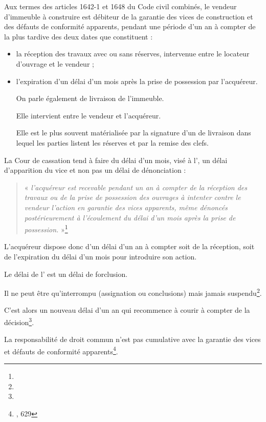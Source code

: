 				Aux termes des articles 1642-1 et 1648 du Code civil combinés, le vendeur d’immeuble à construire est débiteur de la garantie des vices de construction et des défauts de conformité apparents, pendant une période d’un an à compter de la plus tardive des deux dates que constituent :
				\begin{itemize}
					\item la réception des travaux avec ou sans réserves, intervenue entre le locateur d’ouvrage et le vendeur ;

					\item l’expiration d’un délai d’un mois après la prise de possession par l’acquéreur.

						On parle également de livraison de l’immeuble.

						Elle intervient entre le vendeur et l’acquéreur.

						Elle est le plus souvent matérialisée par la signature d’un \pv de livraison dans lequel les parties listent les réserves et par la remise des clefs.
				\end{itemize}


				La Cour de cassation tend à faire du délai d’un mois, visé à l’, un délai d’apparition du vice et non pas un délai de dénonciation :
				\begin{quote}
					« {\itshape l'acquéreur est recevable pendant un an à compter de la réception des travaux ou de la prise de possession des ouvrages à intenter contre le vendeur l'action en garantie des vices apparents, même dénoncés postérieurement à l'écoulement du délai d'un mois après la prise de possession.} »\footnote{}
				\end{quote}

				L’acquéreur dispose donc d’un délai d’un an à compter soit de la réception, soit de l’expiration du délai d’un mois pour introduire son action.

				Le délai de l’ est un délai de forclusion.

				Il ne peut être qu’interrompu (assignation ou conclusions) mais jamais suspendu\footnote{}.

				C’est alors un nouveau délai d’un an qui recommence à courir à compter de la décision\footnote{}.

				La responsabilité de droit commun n’est pas cumulative avec la garantie des vices et défauts de conformité apparents\footnote{, 629}.

